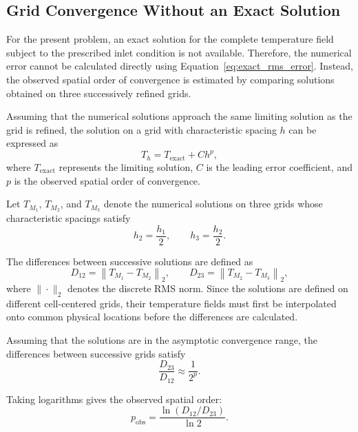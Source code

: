 \subsection{Grid Convergence Without an Exact Solution}

For the present problem, an exact solution for the complete
temperature field subject to the prescribed inlet condition
is not available. Therefore, the numerical error cannot be
calculated directly using Equation~\eqref{eq:exact_rms_error}.
Instead, the observed spatial order of convergence is estimated
by comparing solutions obtained on three successively refined
grids.

Assuming that the numerical solutions approach the same limiting
solution as the grid is refined, the solution on a grid with
characteristic spacing $h$ can be expressed as
\begin{equation}
T_h=T_{\mathrm{exact}}+C h^p,
\label{eq:grid_solution_error}
\end{equation}
where $T_{\mathrm{exact}}$ represents the limiting solution,
$C$ is the leading error coefficient, and $p$ is the observed
spatial order of convergence.

Let $T_{M_1}$, $T_{M_2}$, and $T_{M_3}$ denote the numerical
solutions on three grids whose characteristic spacings satisfy
\begin{equation}
h_2=\frac{h_1}{2},
\qquad
h_3=\frac{h_2}{2}.
\label{eq:grid_refinement_ratio}
\end{equation}

The differences between successive solutions are defined as
\begin{equation}
D_{12}=\left\|T_{M_1}-T_{M_2}\right\|_2,
\qquad
D_{23}=\left\|T_{M_2}-T_{M_3}\right\|_2,
\label{eq:grid_difference_norms}
\end{equation}
where $\|\cdot\|_2$ denotes the discrete RMS norm. Since the
solutions are defined on different cell-centered grids, their
temperature fields must first be interpolated onto common
physical locations before the differences are calculated.

Assuming that the solutions are in the asymptotic convergence
range, the differences between successive grids satisfy
\begin{equation}
\frac{D_{23}}{D_{12}}\approx\frac{1}{2^p}.
\label{eq:grid_convergence_ratio}
\end{equation}

Taking logarithms gives the observed spatial order:
\begin{equation}
\boxed{
p_{\mathrm{obs}}
=
\frac{\ln(D_{12}/D_{23})}{\ln 2}.
}
\label{eq:observed_spatial_order}
\end{equation}

